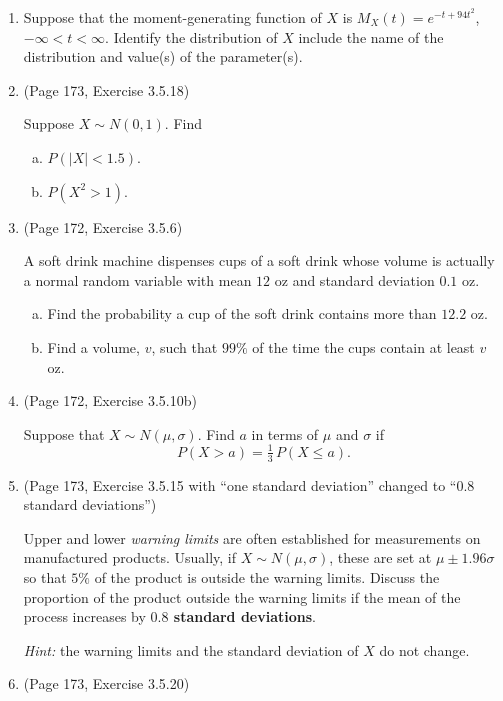 \documentclass[12pt]{article}
\begin{document}
\begin{enumerate}
  \newpage
  \item Suppose that the moment-generating function of $X$ is $M_X(t) = e^{-t + 94 t^2}$, $-\infty < t < \infty$. Identify the distribution of $X$ include the name of the distribution and value(s) of the parameter(s).

  \newpage
  \item (Page 173, Exercise 3.5.18)

    Suppose $X \sim N(0, 1)$. Find
    \begin{enumerate}[(a)]
      \item $P(|X| < 1.5)$.
      \item $P(X^2 > 1)$.
    \end{enumerate}

  \newpage
  \item (Page 172, Exercise 3.5.6)

    A soft drink machine dispenses cups of a soft drink whose volume is actually a normal random variable with mean $12$ oz and standard deviation $0.1$ oz.
    \begin{enumerate}[(a)]
      \item Find the probability a cup of the soft drink contains more than $12.2$ oz.
      \item Find a volume, $v$, such that $99\%$ of the time the cups contain at least $v$ oz.
    \end{enumerate}

  \newpage
  \item (Page 172, Exercise 3.5.10b)

    Suppose that $X \sim N(\mu, \sigma)$. Find $a$ in terms of $\mu$ and $\sigma$ if
    \[
      P(X > a) = \tfrac{1}{3}\, P(X \le a).
    \]

  \newpage
  \item (Page 173, Exercise 3.5.15 with ``one standard deviation'' changed to ``$0.8$ standard deviations'')

    Upper and lower \textit{warning limits} are often established for measurements on manufactured products. Usually, if $X \sim N(\mu, \sigma)$, these are set at $\mu \pm 1.96\sigma$ so that $5\%$ of the product is outside the warning limits. Discuss the proportion of the product outside the warning limits if the mean of the process increases by \textbf{$0.8$ standard deviations}.

    \textit{Hint:} the warning limits and the standard deviation of $X$ do not change.

  \newpage
  \item (Page 173, Exercise 3.5.20)


\end{enumerate}
\end{document}

